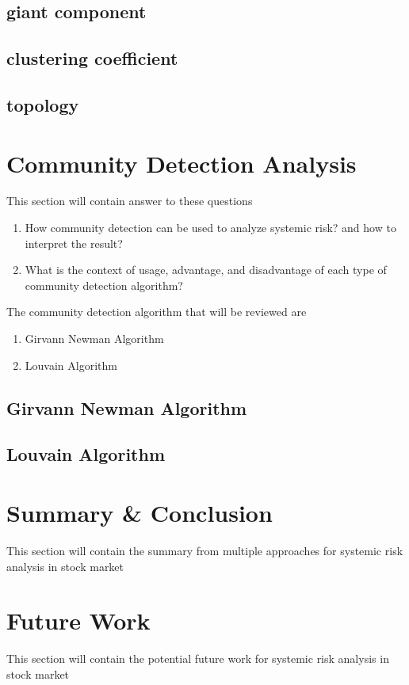 \documentclass[a4paper,11pt]{article}
\begin{document}
\subsection{giant component}
\subsection{clustering coefficient}
\subsection{topology}


\section{Community Detection Analysis}
This section will contain answer to these questions
\begin{enumerate}
    \item How community detection can be used to analyze systemic risk? and how to interpret the result?
    \item What is the context of usage, advantage, and disadvantage of each type of community detection algorithm?
\end{enumerate}

The community detection algorithm that will be reviewed are
\begin{enumerate}
    \item Girvann Newman Algorithm
    \item Louvain Algorithm
\end{enumerate}

\subsection{Girvann Newman Algorithm}
\subsection{Louvain Algorithm}

\section{Summary \& Conclusion}
This section will contain the summary from multiple approaches for systemic risk analysis in stock market

\section{Future Work}
This section will contain the potential future work for systemic risk analysis in stock market



\small
\end{document}
